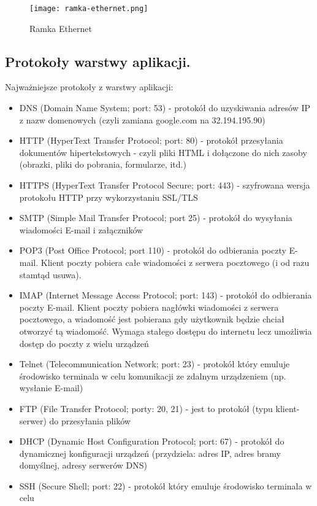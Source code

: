 \documentclass[a4paper,12pt,oneside]{book}
\begin{document}
				\begin{figure}[h!]
					\centering\texttt{[image: ramka-ethernet.png]}
					\caption{Ramka Ethernet}
				\end{figure}
			\newpage\subsection{Protokoły warstwy aplikacji.}
				Najważniejsze protokoły z warstwy aplikacji:
				\begin{itemize}
					\item DNS (Domain Name System; port: 53) - protokół do uzyskiwania adresów IP z nazw
					domenowych (czyli zamiana google.com na 32.194.195.90)
					\item HTTP (HyperText Transfer Protocol; port: 80) - protokół przesyłania dokumentów
					hipertekstowych - czyli pliki HTML i dołączone do nich zasoby (obrazki, pliki do
					pobrania, formularze, itd.)
					\item HTTPS (HyperText Transfer Protocol Secure; port: 443) - szyfrowana wersja
					protokołu HTTP przy wykorzystaniu SSL/TLS
					\item SMTP (Simple Mail Transfer Protocol; port 25) - protokół do wysyłania wiadomości
					E-mail i załączników
					\item POP3 (Post Office Protocol; port 110) - protokół do odbierania poczty E-mail. Klient
					poczty pobiera całe wiadomości z serwera pocztowego (i od razu stamtąd usuwa).
					\item IMAP (Internet Message Access Protocol; port: 143) - protokół do odbierania poczty
					E-mail. Klient poczty pobiera nagłówki wiadomości z serwera pocztowego, a
					wiadomość jest pobierana gdy użytkownik będzie chciał otworzyć tą wiadomość.
					Wymaga stałego dostępu do internetu lecz umożliwia dostęp do poczty z wielu
					urządzeń
					\item Telnet (Telecommunication Network; port: 23) - protokół który emuluje środowisko
					terminala w celu komunikacji ze zdalnym urządzeniem (np. wysłanie E-mail)
					\item FTP (File Transfer Protocol; porty: 20, 21) - jest to protokół (typu klient-serwer) do
					przesyłania plików
					\item DHCP (Dynamic Host Configuration Protocol; port: 67) - protokół do dynamicznej
					konfiguracji urządzeń (przydziela: adres IP, adres bramy domyślnej, adresy
					serwerów DNS)
					\item SSH (Secure Shell; port: 22) - protokół który emuluje środowisko terminala w celu

\end{itemize}
\end{document}
